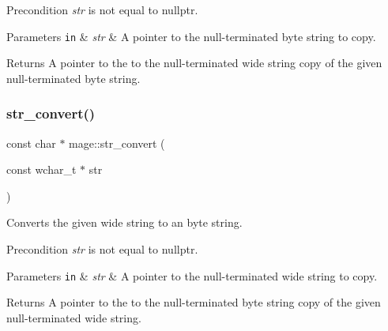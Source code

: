 \begin{DoxyPrecond}{Precondition}
{\itshape str} is not equal to {\ttfamily nullptr}. 
\end{DoxyPrecond}

\begin{DoxyParams}[1]{Parameters}
\mbox{\tt in}  & {\em str} & A pointer to the null-\/terminated byte string to copy. \\
\hline
\end{DoxyParams}
\begin{DoxyReturn}{Returns}
A pointer to the to the null-\/terminated wide string copy of the given null-\/terminated byte string. 
\end{DoxyReturn}
\hypertarget{namespacemage_a93f0e3b596ce1156d1fce19967fc316a}{}\label{namespacemage_a93f0e3b596ce1156d1fce19967fc316a} 
\subsubsection{\texorpdfstring{str\+\_\+convert()}{str\_convert()}\hspace{0.1cm}{\footnotesize\ttfamily [2/4]}}
{\footnotesize\ttfamily const char $\ast$ mage\+::str\+\_\+convert (\begin{DoxyParamCaption}\item[{const wchar\+\_\+t $\ast$}]{str }\end{DoxyParamCaption})}

Converts the given wide string to an byte string.

\begin{DoxyPrecond}{Precondition}
{\itshape str} is not equal to {\ttfamily nullptr}. 
\end{DoxyPrecond}

\begin{DoxyParams}[1]{Parameters}
\mbox{\tt in}  & {\em str} & A pointer to the null-\/terminated wide string to copy. \\
\hline
\end{DoxyParams}
\begin{DoxyReturn}{Returns}
A pointer to the to the null-\/terminated byte string copy of the given null-\/terminated wide string. 
\end{DoxyReturn}
\hypertarget{namespacemage_a9a7ff7b35c293ad8f09d5603f78e4c52}{}\label{namespacemage_a9a7ff7b35c293ad8f09d5603f78e4c52} 
